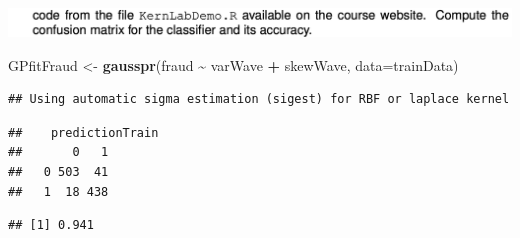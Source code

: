 \documentclass[
]{article}
\newenvironment{Shaded}{\begin{snugshade}}{\end{snugshade}}
\newcommand{\AttributeTok}[1]{\textcolor[rgb]{0.13,0.29,0.53}{#1}}
\newcommand{\FunctionTok}[1]{\textcolor[rgb]{0.13,0.29,0.53}{\textbf{#1}}}
\newcommand{\NormalTok}[1]{#1}
\newcommand{\OtherTok}[1]{\textcolor[rgb]{0.56,0.35,0.01}{#1}}
\newcommand{\SpecialCharTok}[1]{\textcolor[rgb]{0.81,0.36,0.00}{\textbf{#1}}}
\begin{document}
\includegraphics{images/Screenshot 2024-10-13 at 20.11.11.png}

\begin{Shaded}
\begin{Highlighting}[]
\NormalTok{GPfitFraud }\OtherTok{\textless{}{-}} \FunctionTok{gausspr}\NormalTok{(fraud }\SpecialCharTok{\textasciitilde{}}\NormalTok{ varWave }\SpecialCharTok{+}\NormalTok{ skewWave, }\AttributeTok{data=}\NormalTok{trainData)}
\end{Highlighting}
\end{Shaded}

\begin{verbatim}
## Using automatic sigma estimation (sigest) for RBF or laplace kernel
\end{verbatim}

\begin{Shaded}
\end{Shaded}

\begin{verbatim}
##    predictionTrain
##       0   1
##   0 503  41
##   1  18 438
\end{verbatim}

\begin{Shaded}
\end{Shaded}

\begin{verbatim}
## [1] 0.941
\end{verbatim}
\end{document}
